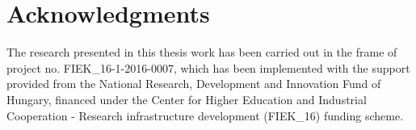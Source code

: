\chapter*{Acknowledgments}

The research presented in this thesis work has been carried out in the frame of project no. FIEK\_16-1-2016-0007, which has been implemented with the support provided from the National Research, Development and Innovation Fund of Hungary, financed under the Center for Higher Education and Industrial Cooperation - Research infrastructure development (FIEK\_16) funding scheme.